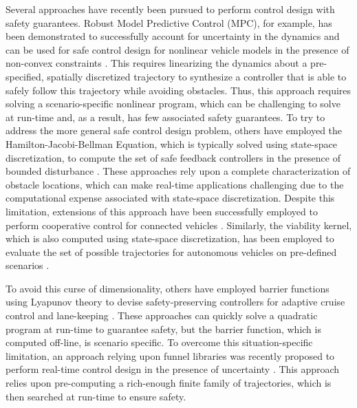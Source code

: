 Several approaches have recently been pursued to perform control design with safety guarantees.
Robust Model Predictive Control (MPC), for example, has been demonstrated to successfully account for uncertainty in the dynamics and can be used for safe control design for nonlinear vehicle models in the presence of non-convex constraints \cite{gao2014tube,shia2014semiautonomous}.
This requires linearizing the dynamics about a pre-specified, spatially discretized trajectory to synthesize a controller that is able to safely follow this trajectory while avoiding obstacles.
Thus, this approach requires solving a scenario-specific nonlinear program, which can be challenging to solve at run-time and, as a result, has few associated safety guarantees.
To try to address the more general safe control design problem, others have employed the Hamilton-Jacobi-Bellman Equation, which is typically solved using state-space discretization, to compute the set of safe feedback controllers in the presence of bounded disturbance \cite{ding2011reachability}.
These approaches rely upon a complete characterization of obstacle locations, which can make real-time applications challenging due to the computational expense associated with state-space discretization.
Despite this limitation, extensions of this approach have been successfully employed to perform cooperative control for connected vehicles \cite{dhinakaran2017hybrid}.
Similarly, the viability kernel, which is also computed using state-space discretization, has been employed to evaluate the set of possible trajectories for autonomous vehicles on pre-defined scenarios \cite{liniger2017real}. 

To avoid this curse of dimensionality, others have employed barrier functions using Lyapunov theory to devise safety-preserving controllers for adaptive cruise control and lane-keeping \cite{nilsson2016correct,xu2016correctness,wang2017safety}.
These approaches can quickly solve a quadratic program at run-time to guarantee safety, but the barrier function, which is computed off-line, is scenario specific. 
To overcome this situation-specific limitation, an approach relying upon funnel libraries was recently proposed to perform real-time control design in the presence of uncertainty \cite{majumdar2016funnel}.
This approach relies upon pre-computing a rich-enough finite family of trajectories, which is then searched at run-time to ensure safety. 


